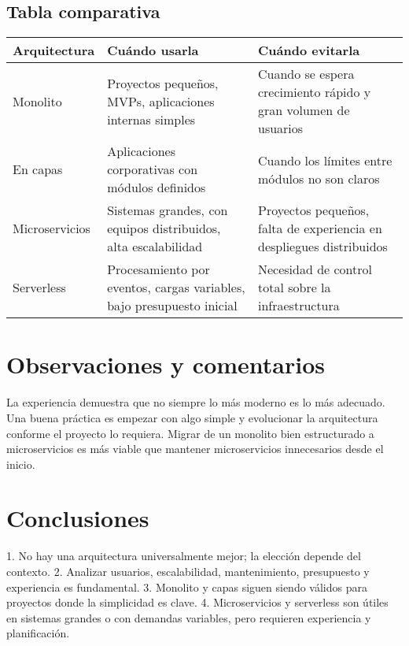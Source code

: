 \documentclass{article}
\begin{document}
\subsection*{Tabla comparativa}
\begin{center}
\begin{tabular}{|m{3cm}|m{5cm}|m{5cm}|}
\hline
\textbf{Arquitectura} & \textbf{Cuándo usarla} & \textbf{Cuándo evitarla} \\
\hline
Monolito & Proyectos pequeños, MVPs, aplicaciones internas simples & Cuando se espera crecimiento rápido y gran volumen de usuarios \\
\hline
En capas & Aplicaciones corporativas con módulos definidos & Cuando los límites entre módulos no son claros \\
\hline
Microservicios & Sistemas grandes, con equipos distribuidos, alta escalabilidad & Proyectos pequeños, falta de experiencia en despliegues distribuidos \\
\hline
Serverless & Procesamiento por eventos, cargas variables, bajo presupuesto inicial & Necesidad de control total sobre la infraestructura \\
\hline
\end{tabular}
\end{center}

\section{Observaciones y comentarios}

La experiencia demuestra que no siempre lo más moderno es lo más adecuado. Una buena práctica es empezar con algo simple y evolucionar la arquitectura conforme el proyecto lo requiera. Migrar de un monolito bien estructurado a microservicios es más viable que mantener microservicios innecesarios desde el inicio.

\section{Conclusiones}

1. No hay una arquitectura universalmente mejor; la elección depende del contexto.
2. Analizar usuarios, escalabilidad, mantenimiento, presupuesto y experiencia es fundamental.
3. Monolito y capas siguen siendo válidos para proyectos donde la simplicidad es clave.
4. Microservicios y serverless son útiles en sistemas grandes o con demandas variables, pero requieren experiencia y planificación.

\printbibliography
\end{document}
